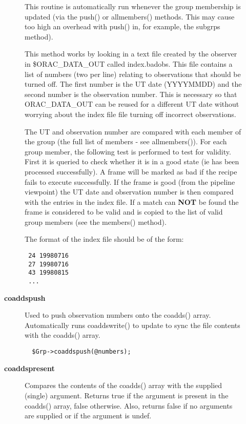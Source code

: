 \begin{description}
\begin{description}
This routine is automatically run whenever the group membership
is updated (via the push() or  allmembers() methods. This may
cause too high an overhead with push() in, for example, the
subgrps method).



This method works by looking in a text file created by the
observer in \$ORAC\_DATA\_OUT called index.badobs. This file
contains a list of numbers (two per line) relating to observations
that should be turned off. The first number is the UT date
(YYYYMMDD) and the second number is the observation
number. This is necessary so that ORAC\_DATA\_OUT can be reused
for a different UT date without worrying about the index file
file turning off incorrect observations.



The UT and observation number are compared with each member of
the group (the full list of members - see allmembers()).
For each group member, the following test is performed to test
for validity. First it is queried to check whether it is in a
good state (ie has been processed successfully).
A frame will be marked as bad if the recipe fails to execute
successfully. If the frame is good (from the pipeline viewpoint)
the UT date and observation number is then compared with the
entries in the index file. If a match can \textbf{NOT} be found the
frame is considered to be valid and is copied to the list of valid
group members (see the members() method).



The format of the index file should be of the form:

\begin{verbatim}
 24 19980716
 27 19980716
 43 19980815
 ...
\end{verbatim}

\item[{\textbf{coaddspush}}] \mbox{}

Used to push observation numbers onto the coadds() array. Automatically
runs coaddswrite() to update to sync the file contents with the coadds()
array.

\begin{verbatim}
  $Grp->coaddspush(@numbers);
\end{verbatim}

\item[{\textbf{coaddspresent}}] \mbox{}

Compares the contents of the coadds() array with the supplied (single)
argument. Returns true if the argument is present in the coadds()
array, false otherwise. Also, returns false if no arguments are supplied
or if the argument is undef.


\end{description}
\end{description}
